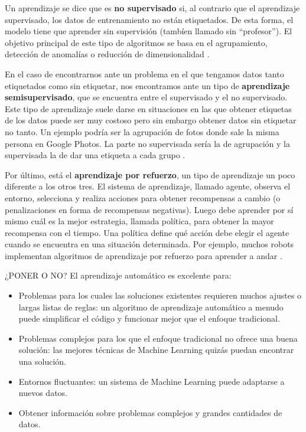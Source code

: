Un aprendizaje se dice que es \textbf{no supervisado} si, al contrario que el aprendizaje supervisado, los datos de entrenamiento no están etiquetados. De esta forma, el modelo tiene que aprender sin supervisión (tambíen llamado sin ``profesor''). El objetivo principal de este tipo de algoritmos se basa en el agrupamiento, detección de anomalías o reducción de dimensionalidad \citep{geron2022hands}. 


En el caso de encontrarnos ante un problema en el que tengamos datos tanto etiquetados como sin etiquetar, nos encontramos ante un tipo de \textbf{aprendizaje semisupervisado}, que se encuentra entre el supervisado y el no supervisado. Este tipo de aprendizaje suele darse en situaciones en las que obtener etiquetas de los datos puede ser muy costoso pero sin embargo obtener datos sin etiquetar no tanto. Un ejemplo podría ser la agrupación de fotos donde sale la misma persona en Google Photos. La parte no supervisada sería la de agrupación y la supervisada la de dar una etiqueta a cada grupo \citep{geron2022hands}.


Por último, está el \textbf{aprendizaje por refuerzo}, un tipo de aprendizaje un poco diferente a los otros tres.  El sistema de aprendizaje, llamado agente, observa el entorno, selecciona y realiza acciones para obtener recompensas a cambio (o penalizaciones en forma de recompensas negativas). Luego debe aprender por sí mismo cuál es la mejor estrategia, llamada política, para obtener la mayor recompensa con el tiempo. Una política define qué acción debe elegir el agente cuando se encuentra en una situación determinada. Por ejemplo, muchos robots implementan algoritmos de aprendizaje por refuerzo para aprender a andar \citep{geron2022hands}.






¿PONER O NO?
El aprendizaje automático es excelente para:

\begin{itemize}
\item Problemas para los cuales las soluciones existentes requieren muchos ajustes o largas listas de reglas: un algoritmo de aprendizaje automático a menudo puede simplificar el código y funcionar mejor que el enfoque tradicional.

\item Problemas complejos para los que el enfoque tradicional no ofrece una buena solución: las mejores técnicas de Machine Learning quizás puedan encontrar una solución.

\item Entornos fluctuantes: un sistema de Machine Learning puede adaptarse a nuevos datos.

\item Obtener información sobre problemas complejos y grandes cantidades de datos.
\end{itemize}


